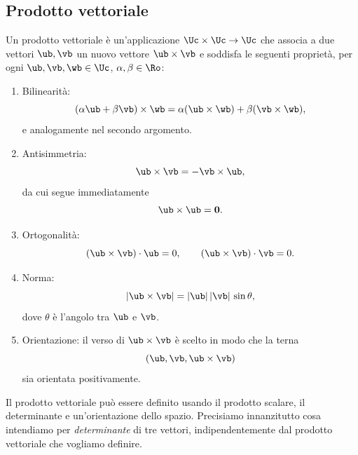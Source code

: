 


\subsection{Prodotto vettoriale}\label{prodvet}
Un prodotto vettoriale è un'applicazione $\Uc\times\Uc\to\Uc$ che associa a due vettori $\ub, \vb$ un nuovo vettore $\ub\times\vb$ e soddisfa le seguenti proprietà, 
per ogni $\ub,\vb,\wb\in\Uc$, $\alpha,\beta\in\Ro$:
\begin{enumerate}
	\item Bilinearità:
	\begin{equation}
		(\alpha\ub+\beta\vb)\times \wb=\alpha(\ub\times\wb)+\beta(\vb\times\wb),
	\end{equation}
e analogamente nel secondo argomento.
\item Antisimmetria:
\begin{equation}
	\ub\times\vb=-\vb\times\ub,
\end{equation}
da cui segue immediatamente
\begin{equation}
	\ub\times\ub=\mathbf{0}.
\end{equation}
\item Ortogonalità:
\begin{equation}
	(\ub\times\vb)\cdot \ub=0, \qquad 	(\ub\times\vb)\cdot\vb=0.
\end{equation}
\item Norma:
\begin{equation}\label{eq:prod_vett_modulo}
	|\ub\times\vb|=|\ub|\,|\vb|\,\sin\theta,
\end{equation}
dove $\theta$ è l'angolo tra $\ub$ e $\vb$.
\item Orientazione: il verso di $\ub\times\vb$ è scelto in modo che la terna
\begin{equation}
(\ub, \vb, \ub\times\vb)
\end{equation}
sia orientata positivamente.
\end{enumerate}



Il prodotto vettoriale può essere definito usando il prodotto scalare, il
	determinante e un'orientazione dello spazio. Precisiamo innanzitutto cosa
	intendiamo per \emph{determinante} di tre vettori, indipendentemente dal
	prodotto vettoriale che vogliamo definire.
	
